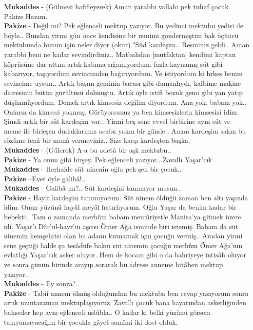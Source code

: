 \documentclass[]{book}
\begin{document}
\textbf{Mukaddes} - (Gülmesi hafifleyerek) Aman yarabbi vallahi pek tuhaf çocuk Pakize Hanım.\\
\textbf{Pakize} - Değil mi? Pek eğlenceli mektup yazıyor. Bu yedinci mektubu yedisi de böyle.. Bundan yirmi gün önce kendisine bir rsmimi göndermiştim bak üçüncü mektubunda bunun için neler diyor (okur) "Süd kardeşim.. Resminiz geldi.. Aman yarabbi beni ne kadar sevindirdiniz.. Matbahdan {[}mutfaktan{]} kendimi kaptan köprüsüne dar attım artık kabıma sığamıyordum. fazla kaynamış süt gibi
kabarıyor, taşıyordum sevincimden bağırıyordum. Ve istiyordum ki hrkes benim sevincime uysun.. Artık başım geminin bacası gibi dumanlıydı, kalbime makine dairesinin bütün gürültüsü dolmuştu. Artık öyle istifi bozuk gemi gibi yan yatıp düşünmüyordum. Demek artık kimsesiz değilim diyordum. Ana yok, babam yok.. Onların da kimsesi yokmuş. Görüyorsunuz ya ben kimsesizlerin kimsesizi idim. Şimdi artık bir süt kardeşim var.. Yirmi beş sene evvel birbirine aynı süt ve meme ile birleşen dudaklarımız acaba yakın bir günde.. Aman kardeşim sakın bu sözüme fenâ bir manâ vermeyiniz.. Size karşı kardeşten başka.\\
\textbf{Mukaddes} - (Gülerek) A-a bu adetâ bir aşk mektubu..\\
\textbf{Pakize} - Ya onun gibi birşey. Pek eğlenceli yazıyor.. Zavallı Yaşar'cık\\
\textbf{Mukaddes} - Herhalde süt ninenin oğlu pek şen bir çocuk..\\
\textbf{Pakize} --Evet öyle galibâ!..\\
\textbf{Mukaddes} - Galibâ mı?.. Süt kardeşini tanımıyor musun..\\
\textbf{Pakize} - Hayır kardeşim tanımıyorum. Süt ninem öldüğü zaman ben altı yaşında idim. Onun yüzünü hayâl meyâl hatırlıyorum. Oğlu Yaşar da benim kadar bir bebekti.. Tam o zamanda merhûm babam memûriyetle Manisa'ya gitmek üzere idi. Yaşar'ı Dâr'ül-hayr'ın aşcısı Ömer Ağa isminde biri istemiş. Babam da süt ninemin hemşehrisi olan bu adamı kırmamak için çocuğu vermiş.. Aradan yirmi sene geçtiği halde şu tesâdüfe bakın süt ninemin çocuğu merhûm Ömer Ağa'nın evlatlığı Yaşar'cık asker oluyor. Hem de kocam gibi o da bahriyeye intisâb oluyor ve sonra günün birinde arayıp sorarak bu adrese anneme hitâben mektup yazıyor..\\
\textbf{Mukaddes} - Ey sonra?..\\
\textbf{Pakize} - Tabii annem ölmüş olduğundan bu mektuba ben cevap yazıyorum sonra artık muntazaman mektuplaşıyoruz. Zavallı çocuk bana hayatından askerliğinden bahseder hep aynı eğlenceli uslûbla.. O kadar ki belki yüzünü görsem tanıyamayacağım bir çocukla gâyet samîmî iki dost olduk.\\
\end{document}
